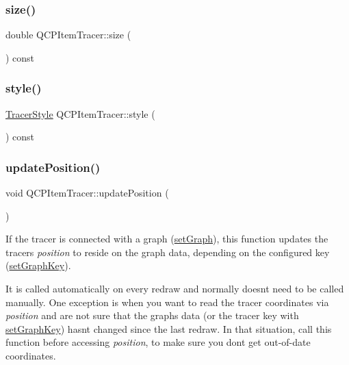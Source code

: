 \subsubsection{\texorpdfstring{size()}{size()}}
{\footnotesize\ttfamily double Q\+C\+P\+Item\+Tracer\+::size (\begin{DoxyParamCaption}{ }\end{DoxyParamCaption}) const\hspace{0.3cm}{\ttfamily [inline]}}

\mbox{\label{class_q_c_p_item_tracer_afdaee32c9ccc9c14502b28d3d86bf5ed}} 
\subsubsection{\texorpdfstring{style()}{style()}}
{\footnotesize\ttfamily \hyperlink{class_q_c_p_item_tracer_a2f05ddb13978036f902ca3ab47076500}{Tracer\+Style} Q\+C\+P\+Item\+Tracer\+::style (\begin{DoxyParamCaption}{ }\end{DoxyParamCaption}) const\hspace{0.3cm}{\ttfamily [inline]}}

\mbox{\label{class_q_c_p_item_tracer_a5b90296109e36384aedbc8908a670413}} 
\subsubsection{\texorpdfstring{update\+Position()}{updatePosition()}}
{\footnotesize\ttfamily void Q\+C\+P\+Item\+Tracer\+::update\+Position (\begin{DoxyParamCaption}{ }\end{DoxyParamCaption})}

If the tracer is connected with a graph (\hyperlink{class_q_c_p_item_tracer_af5886f4ded8dd68cb4f3388f390790c0}{set\+Graph}), this function updates the tracer\textquotesingle{}s {\itshape position} to reside on the graph data, depending on the configured key (\hyperlink{class_q_c_p_item_tracer_a6840143b42f3b685cedf7c6d83a704c8}{set\+Graph\+Key}).

It is called automatically on every redraw and normally doesn\textquotesingle{}t need to be called manually. One exception is when you want to read the tracer coordinates via {\itshape position} and are not sure that the graph\textquotesingle{}s data (or the tracer key with \hyperlink{class_q_c_p_item_tracer_a6840143b42f3b685cedf7c6d83a704c8}{set\+Graph\+Key}) hasn\textquotesingle{}t changed since the last redraw. In that situation, call this function before accessing {\itshape position}, to make sure you don\textquotesingle{}t get out-\/of-\/date coordinates.

